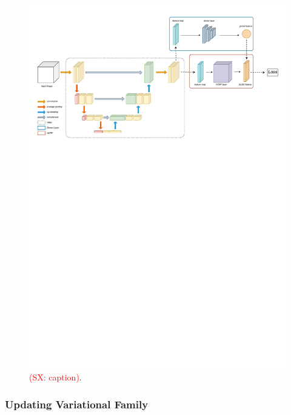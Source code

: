 \documentclass[conference]{IEEEtran}
\let\oldsubsubsection\subsubsection
\renewcommand{\subsubsection}[1]{\oldsubsubsection{\textbf{#1}}}
\newcommand{\sx}[1]{\textcolor{red}{(SX: #1)}}
\begin{document}
\begin{figure}[tbp]
\centering
\includegraphics[width=\textwidth]{workframe}
\caption{\sx{caption}.}
\label{fig:workframe}
\end{figure}


\subsubsection{Updating Variational Family}
\end{document}
